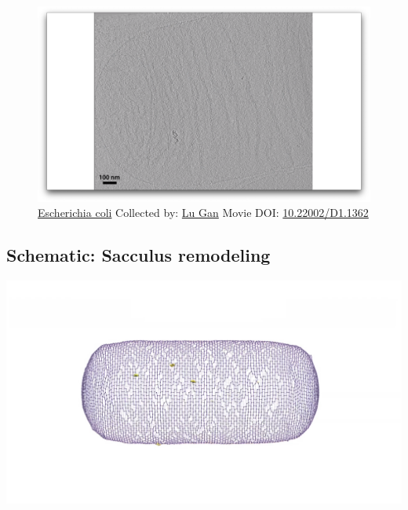 \documentclass[]{tufte-book}
\begin{document}
\begin{figure}
\includegraphics{movie_stills/2_3a} \caption[\protect\hyperlink{tree}{Escherichia coli} Collected by:
\protect\hyperlink{lu_gan}{Lu Gan} Movie DOI:
\href{https://doi.org/10.22002/D1.1362}{10.22002/D1.1362}]{\protect\hyperlink{tree}{Escherichia coli} Collected by:
\protect\hyperlink{lu_gan}{Lu Gan} Movie DOI:
\href{https://doi.org/10.22002/D1.1362}{10.22002/D1.1362}}\label{fig:2-3a}
\end{figure}

\hypertarget{Sacculus_remodeling}{\subsection*{Schematic: Sacculus
remodeling}\label{Sacculus_remodeling}}

\includegraphics{img/schematics/2_3_2}
\end{document}
